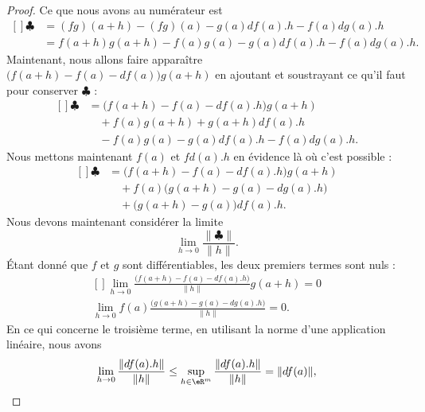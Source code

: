 \begin{proof}
	Ce que nous avons au numérateur est
	\begin{equation}
		\begin{aligned}[]
			\clubsuit&=(fg)(a+h)-(fg)(a)-g(a)df(a).h-f(a)dg(a).h\\
				&=f(a+h)g(a+h)-f(a)g(a)-g(a)df(a).h-f(a)dg(a).h.
		\end{aligned}
	\end{equation}
	Maintenant, nous allons faire apparaître $\big( f(a+h)-f(a)-df(a) \big)g(a+h)$ en ajoutant et soustrayant ce qu'il faut pour conserver $\clubsuit$ :
	\begin{equation}
		\begin{aligned}[]
			\clubsuit&=\big( f(a+h)-f(a)-df(a).h \big)g(a+h)\\
					&\quad +f(a)g(a+h)+g(a+h)df(a).h\\
					&\quad -f(a)g(a)-g(a)df(a).h-f(a)dg(a).h.
		\end{aligned}
	\end{equation}
	Nous mettons maintenant $f(a)$ et $fd(a).h$ en évidence là où c'est possible :
	\begin{equation}
		\begin{aligned}[]
			\clubsuit&=\big( f(a+h)-f(a)-df(a).h \big)g(a+h)\\
				&\quad+f(a)\big( g(a+h)-g(a)-dg(a).h \big)\\
				&\quad+\big( g(a+h)-g(a) \big)df(a).h.
		\end{aligned}
	\end{equation}
    Nous devons maintenant considérer la limite
	\begin{equation}
		\lim_{h\to 0}\frac{ \| \clubsuit \| }{ \| h \| }.
	\end{equation}
    Étant donné que $f$ et $g$ sont différentiables, les deux premiers termes sont nuls :
    \begin{equation}
        \begin{aligned}[]
            \lim_{h\to 0}\frac{ \big( f(a+h)-f(a)-df(a).h \big)}{\| h \|}g(a+h)=0\\
            \lim_{h\to 0} f(a)\frac{ \big( g(a+h)-g(a)-dg(a).h \big)}{\| h \|}=0.
        \end{aligned}
    \end{equation}
    En ce qui concerne le troisième terme, en utilisant la norme d'une application linéaire, nous avons
	\begin{equation}
		\lim_{h\to 0} \frac{ \| df(a).h \| }{ \| h \| }\leq\sup_{h\in\eR^m}\frac{ \| df(a).h \| }{ \| h \| }=\| df(a) \|,
	\end{equation}

\end{proof}
